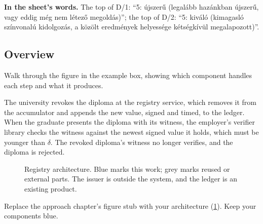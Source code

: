 \textbf{In the sheet's words.} The top of D/1: \enquote{5: újszerű (legalább hazánkban újszerű, vagy eddig még nem létező megoldás)}; the top of D/2: \enquote{5: kiváló (kimagasló színvonalú kidolgozás, a közölt eredmények helyessége kétségkívül megalapozott)}.

\subsection[Overview]{Overview\skimmark}\label{app:chapters:overview}
Walk through the figure in the example box, showing which component handles each step and what it produces.
\begin{runningexample}
The university revokes the diploma at the registry service, which removes it from the accumulator and appends the new value, signed and timed, to the ledger. When the graduate presents the diploma with its witness, the employer's verifier library checks the witness against the newest signed value it holds, which must be younger than $\delta$. The revoked diploma's witness no longer verifies, and the diploma is rejected.
\end{runningexample}

\begin{figure}[!ht]
  \centering
  \caption{Registry architecture. Blue marks this work; grey marks reused or external parts. The issuer is outside the system, and the ledger is an existing product.}
  \label{fig:guide:architecture}
\end{figure}
Replace the approach chapter's figure stub with your architecture (\cref{fig:guide:architecture}). Keep your components blue.


